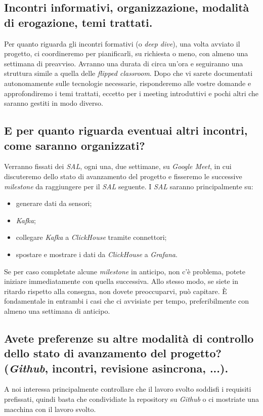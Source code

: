 \subsection{Incontri informativi, organizzazione, modalità di erogazione, temi trattati.}
Per quanto riguarda gli incontri formativi (o \textit{deep dive}), una volta avviato il progetto, ci coordineremo per pianificarli, su richiesta o meno, con almeno una settimana di preavviso. Avranno una durata di circa un'ora e seguiranno una struttura simile a quella delle \textit{flipped classroom}. Dopo che vi sarete documentati autonomamente sulle tecnologie necessarie, risponderemo alle vostre domande e approfondiremo i temi trattati, eccetto per i meeting introduttivi e pochi altri che saranno gestiti in modo diverso.
\subsection{E per quanto riguarda eventuai altri incontri, come saranno organizzati?}
Verranno fissati dei \textit{SAL}, ogni una, due settimane, su \textit{Google Meet}, in cui discuteremo dello stato di avanzamento del progetto e fisseremo le successive \textit{milestone} da raggiungere per il \textit{SAL} seguente. I \textit{SAL} saranno principalmente su:
\begin{itemize}
    \setlength\itemsep{0em}
    \item generare dati da sensori;
    \item \textit{Kafka};
    \item collegare \textit{Kafka} a \textit{ClickHouse} tramite connettori;
    \item spostare e mostrare i dati da \textit{ClickHouse} a \textit{Grafana}.
\end{itemize}
Se per caso completate alcune \textit{milestone} in anticipo, non c'è problema, potete iniziare immediatamente con quella successiva. Allo stesso modo, se siete in ritardo rispetto alla consegna, non dovete preoccuparvi, può capitare. È fondamentale in entrambi i casi che ci avvisiate per tempo, preferibilmente con almeno una settimana di anticipo.
\subsection{Avete preferenze su altre modalità di controllo dello stato di avanzamento del progetto? (\textit{Github}, incontri, revisione asincrona, ...).}
A noi interessa principalmente controllare che il lavoro svolto soddisfi i requisiti prefissati, quindi basta che condividiate la repository su \textit{Github} o ci mostriate una macchina con il lavoro svolto.
